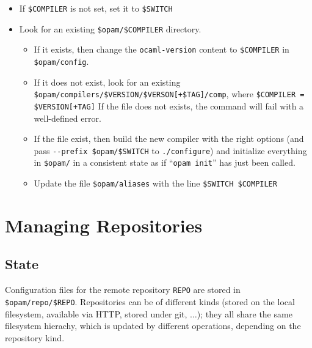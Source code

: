 \documentclass[a4paper,10pt]{article}
\begin{document}
\begin{itemize}

\item If \verb+$COMPILER+ is not set, set it to \verb+$SWITCH+

\item Look for an existing \verb+$opam/$COMPILER+ directory.

\begin{itemize}
\item If it
  exists, then change the {\tt ocaml-version} content to
  \verb+$COMPILER+ in  \verb+$opam/config+.

\item If it does not exist, look for an existing
  \verb|$opam/compilers/$VERSION/$VERSON[+$TAG]/comp|, where
  \verb|$COMPILER = $VERSION[+TAG]| If the file does not exists, the
  command will fail with a well-defined error.

\item If the file exist, then build the new compiler with the right
  options (and pass \verb+--prefix $opam/$SWITCH+ to
  \verb+./configure+) and initialize everything in \verb+$opam/+
  in a consistent state as if ``\verb+opam init+'' has just been called.

\item Update the file \verb+$opam/aliases+ with the line
  \verb+$SWITCH $COMPILER+

\end{itemize}

\end{itemize}

\section{Managing Repositories}
\label{section:repositories}

\subsection{State}
\label{state-repo}

Configuration files for the remote repository \verb+REPO+ are stored in
\verb+$opam/repo/$REPO+. Repositories can be of different kinds
(stored on the local filesystem, available via HTTP, stored under git,
$\ldots$); they all share the same filesystem hierachy, which is
updated by different operations, depending on the repository kind.
\end{document}
